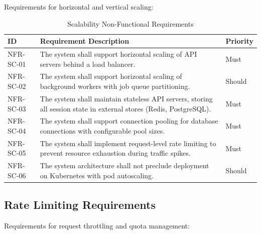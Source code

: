\documentclass[a4paper,twoside]{sapthesis}
\begin{document}
Requirements for horizontal and vertical scaling:

\begin{table}[htbp]
\centering
\caption{Scalability Non-Functional Requirements}
\label{tab:nfr-scalability}
\small
\begin{tabularx}{\textwidth}{|l|X|l|}
\hline
\textbf{ID} & \textbf{Requirement Description} & \textbf{Priority} \\
\midrule
NFR-SC-01 & The system shall support horizontal scaling of API servers behind a load balancer. & Must \\
\midrule
NFR-SC-02 & The system shall support horizontal scaling of background workers with job queue partitioning. & Should \\
\midrule
NFR-SC-03 & The system shall maintain stateless API servers, storing all session state in external stores (Redis, PostgreSQL). & Must \\
\midrule
NFR-SC-04 & The system shall support connection pooling for database connections with configurable pool sizes. & Must \\
\midrule
NFR-SC-05 & The system shall implement request-level rate limiting to prevent resource exhaustion during traffic spikes. & Must \\
\midrule
NFR-SC-06 & The system architecture shall not preclude deployment on Kubernetes with pod autoscaling. & Should \\
\midrule
\end{tabularx}
\end{table}

\subsection{Rate Limiting Requirements}
\label{subsec:nfr-ratelimit}

Requirements for request throttling and quota management:
\end{document}
